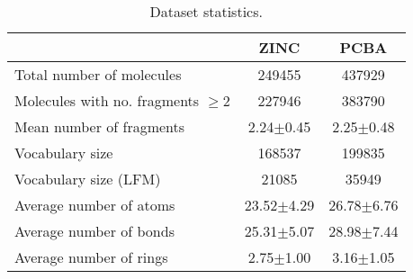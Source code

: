 \begin{table}[h!]
    \begin{center}
    \caption{Dataset statistics.}\label{tab:mol-statistics}
    \renewcommand{\arraystretch}{1.2}
    \begin{tabular}{lcc}
        \toprule

        \textbf{} & \textbf{ZINC} & \textbf{PCBA}\\
        \midrule
        Total number of molecules     & 249455    & 437929\\
        Molecules with no. fragments $\geq 2$  & 227946 & 383790\\
        Mean number of fragments & 2.24$\pm$0.45 & 2.25$\pm$0.48\\
        Vocabulary size & 168537 & 199835\\
        Vocabulary size (LFM) & 21085 & 35949\\
        Average number of atoms & 23.52$\pm$4.29 & 26.78$\pm$6.76\\
        Average number of bonds & 25.31$\pm$5.07 & 28.98$\pm$7.44\\
        Average number of rings & 2.75$\pm$1.00 & 3.16$\pm$1.05\\
        \bottomrule
    \end{tabular}
    \end{center}
\end{table}